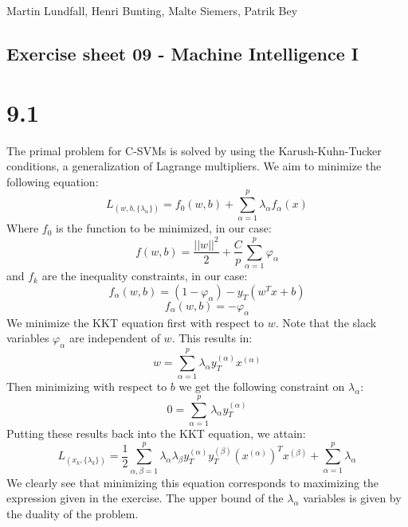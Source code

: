 \documentclass[11pt,a4paper]{article}
\begin{document}
\noindent
Martin Lundfall, Henri Bunting, Malte Siemers, Patrik Bey
\begin{centering}
  \section*{Exercise sheet 09 - Machine Intelligence I}
  \end{centering}
\section*{9.1}
The primal problem for C-SVMs is solved by using the Karush-Kuhn-Tucker conditions, a generalization of Lagrange multipliers. We aim to minimize the following equation:
\begin{equation}
  L_{(w, b, \{\lambda_\alpha\})} = f_0(w, b) + \sum_{\alpha=1}^p \lambda_\alpha f_\alpha(x)
\end{equation}
Where $f_0$ is the function to be minimized, in our case:
\begin{equation}
f(w,b) = \frac{||w||^2}{2} + \frac{C}{p}\sum_{\alpha=1}^p \varphi_\alpha
\end{equation}
 and $f_k$ are the inequality constraints, in our case:
\begin{equation}
f_\alpha(w, b) = (1 - \varphi_\alpha) - y_T (w^Tx + b)
\end{equation}
\begin{equation}
f_\alpha(w, b) = - \varphi_\alpha
\end{equation}
We minimize the KKT equation first with respect to $w$. Note that the slack variables $\varphi_\alpha$ are independent of $w$. This results in:
\begin{equation}
w = \sum_{\alpha=1}^p \lambda_\alpha y_T^{(\alpha)}x^{(\alpha)}
\end{equation}
Then minimizing with respect to $b$ we get the following constraint on $\lambda_\alpha$:
\begin{equation}
0 = \sum_{\alpha=1}^p \lambda_\alpha y_T^{(\alpha)}
\end{equation}
Putting these results back into the KKT equation, we attain:
\begin{equation}
L_{(x_k, \{\lambda_k\})} = \frac{1}{2} \sum _{\alpha, \beta=1}^p\lambda_\alpha \lambda_\beta y_T^{(\alpha)}y_T^{(\beta)}(x^{(\alpha)})^Tx^{(\beta)}+\sum_{\alpha=1}^p\lambda_\alpha
\end{equation}
We clearly see that minimizing this equation corresponds to maximizing the expression given in the exercise. The upper bound of the $\lambda_\alpha$ variables is given by the duality of the problem.
\end{document}

